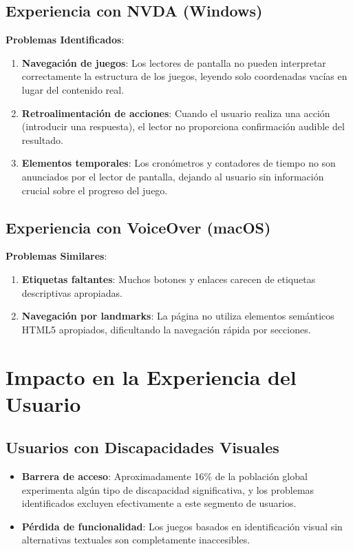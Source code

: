 \documentclass{article}
\begin{document}
	\subsection{Experiencia con NVDA (Windows)}
	
	\noindent
	\textbf{Problemas Identificados}:
	\begin{enumerate}
		\item \textbf{Navegación de juegos}: Los lectores de pantalla no pueden interpretar correctamente la estructura de los juegos, leyendo solo coordenadas vacías en lugar del contenido real.
		\item \textbf{Retroalimentación de acciones}: Cuando el usuario realiza una acción (introducir una respuesta), el lector no proporciona confirmación audible del resultado.
		\item \textbf{Elementos temporales}: Los cronómetros y contadores de tiempo no son anunciados por el lector de pantalla, dejando al usuario sin información crucial sobre el progreso del juego.
	\end{enumerate}

	\subsection{Experiencia con VoiceOver (macOS)}
	
	\noindent
	\textbf{Problemas Similares}:
	\begin{enumerate}
		\item \textbf{Etiquetas faltantes}: Muchos botones y enlaces carecen de etiquetas descriptivas apropiadas.
		\item \textbf{Navegación por landmarks}: La página no utiliza elementos semánticos HTML5 apropiados, dificultando la navegación rápida por secciones.
	\end{enumerate}

	\section{Impacto en la Experiencia del Usuario}

	\subsection{Usuarios con Discapacidades Visuales}
	\begin{itemize}
		\item \textbf{Barrera de acceso}: Aproximadamente 16\% de la población global experimenta algún tipo de discapacidad significativa, y los problemas identificados excluyen efectivamente a este segmento de usuarios.
		\item \textbf{Pérdida de funcionalidad}: Los juegos basados en identificación visual sin alternativas textuales son completamente inaccesibles.
	\end{itemize}
\end{document}
